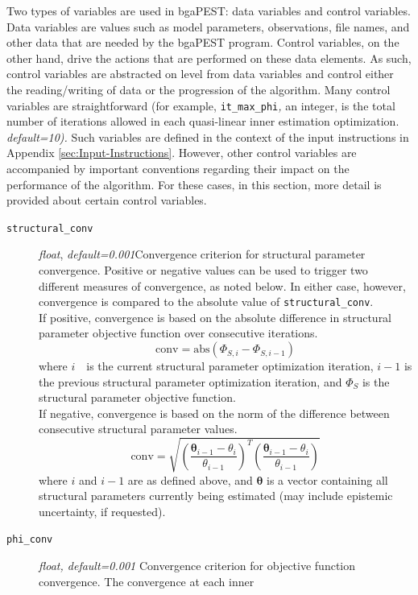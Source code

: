 \documentclass[11pt,oneside,onecolumn]{usgsreport}
\begin{document}
\begin{multicols}{2}
\begin{bibunit}
Two types of variables are used in bgaPEST: data variables and control
variables. Data variables are values such as model parameters, observations,
file names, and other data that are needed by the bgaPEST program.
Control variables, on the other hand, drive the actions that are performed
on these data elements. As such, control variables are abstracted
on level from data variables and control either the reading/writing
of data or the progression of the algorithm. Many control variables
are straightforward (for example, \texttt{it\_max\_phi}\emph{, }an
integer, is the total number of iterations allowed in each quasi-linear
inner estimation optimization. \emph{default=10).} Such variables
are defined in the context of the input instructions in Appendix \ref{sec:Input-Instructions}.
However, other control variables are accompanied by important conventions
regarding their impact on the performance of the algorithm. For these
cases, in this section, more detail is provided about certain control
variables.
\begin{description}
\item [{\texttt{structural\_conv}}] \emph{float}, \emph{default=0.001}Convergence
criterion for structural parameter convergence. Positive or negative
values can be used to trigger two different measures of convergence,
as noted below. In either case, however, convergence is compared to
the absolute value of \texttt{structural\_conv}. \\
If positive, convergence is based on the absolute difference in structural
parameter objective function over consecutive iterations. 
\[
\mathrm{conv}=\mathrm{abs}\left(\Phi_{S,i}-\Phi_{S,i-1}\right)
\]
where $i\mbox{ }$ is the current structural parameter optimization
iteration, $i-1$ is the previous structural parameter optimization
iteration, and $\Phi_{S}$ is the structural parameter objective
function.\\
If negative, convergence is based on the norm of the difference between
consecutive structural parameter values.
\[
\mathrm{conv=}\sqrt{\left(\frac{\mathbf{\theta}_{i-1}-\theta_{i}}{\theta_{i-1}}\right)^{T}\left(\frac{\mathbf{\theta}_{i-1}-\theta_{i}}{\theta_{i-1}}\right)}
\]
where $i$ and $i-1$ are as defined above, and $\mathbf{\theta}$
is a vector containing all structural parameters currently being estimated
(may include epistemic uncertainty, if requested). 
\item [{\texttt{phi\_conv}}] \emph{float, default=0.001 }Convergence criterion
for objective function convergence. The convergence at each inner

\end{description}
\end{bibunit}
\end{multicols}
\end{document}
